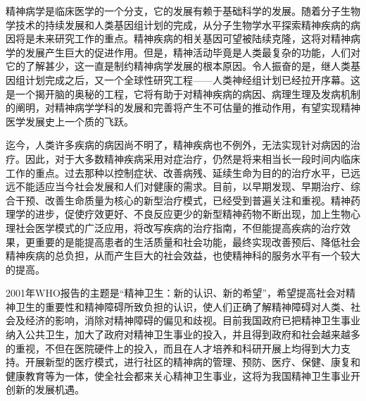 精神病学是临床医学的一个分支，它的发展有赖于基础科学的发展。随着分子生物学技术的持续发展和人类基因组计划的完成，从分子生物学水平探索精神疾病的病因将是未来研究工作的重点。精神疾病的相关基因可望被陆续克隆，这将对精神病学的发展产生巨大的促进作用。但是，精神活动毕竟是人类最复杂的功能，人们对它的了解甚少，这一直是制约精神病学发展的根本原因。令人振奋的是，继人类基因组计划完成之后，又一个全球性研究工程------人类神经组计划已经拉开序幕。这是一个揭开脑的奥秘的工程，它将有助于对精神疾病的病因、病理生理及发病机制的阐明，对精神病学学科的发展和完善将产生不可估量的推动作用，有望实现精神医学发展史上一个质的飞跃。

迄今，人类许多疾病的病因尚不明了，精神疾病也不例外，无法实现针对病因的治疗。因此，对于大多数精神疾病采用对症治疗，仍然是将来相当长一段时间内临床工作的重点。过去那种以控制症状、改善病残、延续生命为目的的治疗水平，已远远不能适应当今社会发展和人们对健康的需求。目前，以早期发现、早期治疗、综合干预、改善生命质量为核心的新型治疗模式，已经受到普遍关注和重视。精神药理学的进步，促使疗效更好、不良反应更少的新型精神药物不断出现，加上生物心理社会医学模式的广泛应用，将改写疾病的治疗指南，不但能提高疾病的治疗效果，更重要的是能提高患者的生活质量和社会功能，最终实现改善预后、降低社会精神疾病的总负担，从而产生巨大的社会效益，也使精神科的服务水平有一个较大的提高。

2001年WHO报告的主题是“精神卫生：新的认识、新的希望”，希望提高社会对精神卫生的重要性和精神障碍所致负担的认识，使人们正确了解精神障碍对人类、社会及经济的影响，消除对精神障碍的偏见和歧视。目前我国政府已把精神卫生事业纳入公共卫生，加大了政府对精神卫生事业的投入，并且得到政府和社会越来越多的重视，不但在医院硬件上的投入，而且在人才培养和科研开展上均得到大力支持。开展新型的医疗模式，进行社区的精神病的管理、预防、医疗、保健、康复和健康教育等为一体，使全社会都来关心精神卫生事业，这将为我国精神卫生事业开创新的发展机遇。
